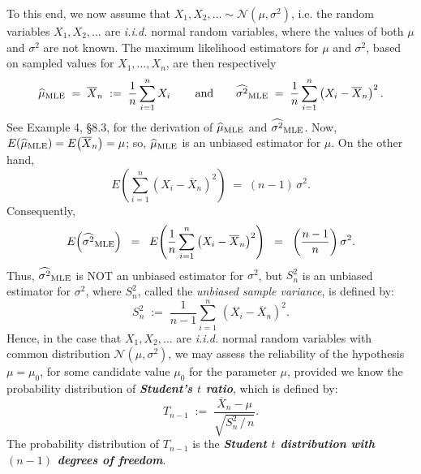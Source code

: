 \documentclass{article}
\begin{document}
To this end, we now assume that $X_{1},X_{2},\ldots\sim \mathcal{N}(\mu,\sigma^{2})$, i.e. the random variables $X_{1},X_{2},\ldots$ are \emph{i.i.d.} normal random variables, where the values of both $\mu$ and $\sigma^{2}$ are not known.  The maximum likelihood estimators for $\mu$ and $\sigma^{2}$, based on sampled values for $X_{1}, \ldots, X_{n}$, are then respectively
\begin{equation*}
\widehat{\mu}_{\textnormal{MLE}} \; = \; \overline{X}_{n} \; := \; \dfrac{1}{n}\sum_{i=1}^{n}X_{i}\,
\quad\quad \textnormal{and} \quad\quad
\widehat{\sigma^{2}}_{\textnormal{MLE}} \; = \; \dfrac{1}{n}\sum_{i=1}^{n}\left(X_{i}-\overline{X}_{n}\right)^{2}.
\end{equation*}
See Example 4, \S8.3, \cite{EwensGrant} for the derivation of $\widehat{\mu}_{\textnormal{MLE}}$ and $\widehat{\sigma^{2}}_{\textnormal{MLE}}$.
Now, $E\!\left(\widehat{\mu}_{\textnormal{MLE}}\right) = E\!\left(\overline{X}_{n}\right) = \mu$; so, $\widehat{\mu}_{\textnormal{MLE}}$ is an unbiased estimator for $\mu$.  On the other hand,
\begin{equation*}
E\!\left(\sum_{i=1}^{n}\left(X_{i}-\overline{X}_{n}\right)^{2}\right) \; = \; (n-1)\,\sigma^{2}.
\end{equation*}
Consequently,
\begin{equation*}
           E\!\left(\widehat{\sigma^{2}}_{\textnormal{MLE}}\right)
\;\;=\;\; E\!\left(\dfrac{1}{n}\sum_{i=1}^{n}\left(X_{i}-\overline{X}_{n}\right)^{2}\right)
\;\;=\;\; \left(\frac{n-1}{n}\right)\sigma^{2}.
\end{equation*}
Thus, $\widehat{\sigma^{2}}_{\textnormal{MLE}}$ is NOT an unbiased estimator for $\sigma^{2}$, but $S_{n}^{2}$ is an unbiased estimator for $\sigma^{2}$, where $S_{n}^{2}$, called the \emph{unbiased sample variance}, is defined by:
\begin{equation*}
S_{n}^{2} \; := \; \dfrac{1}{n-1}\sum_{i=1}^{n}\,\left(X_{i}-\overline{X}_{n}\right)^{2}.
\end{equation*}
Hence, in the case that $X_{1},X_{2},\ldots$ are \emph{i.i.d.} normal random variables with common distribution $\mathcal{N}(\mu,\sigma^{2})$, we may assess the reliability of the hypothesis $\mu = \mu_{0}$, for some candidate value $\mu_{0}$ for the parameter $\mu$, provided we know the probability distribution of \textbf{\emph{Student's $t$ ratio}}, which is defined by:
\begin{equation*}
T_{n-1} \; := \; \dfrac{\overline{X}_{n} - \mu}{\sqrt{S_{n}^{2}\,/\,n}}.
\end{equation*}
The probability distribution of $T_{n-1}$ is the \textbf{\emph{Student $t$ distribution with $(n-1)$ degrees of freedom}}.
\end{document}
